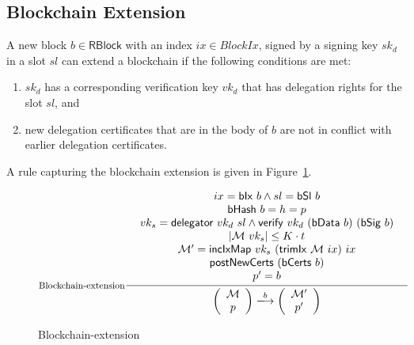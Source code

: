 \documentclass[11pt,a4paper]{article}
\newcommand{\fun}[1]{\mathsf{#1}}
\newcommand{\type}[1]{\mathsf{#1}}
\newcommand{\size}[1]{\left| #1 \right|}
\newcommand{\trans}[2]{\xlongrightarrow[\textsc{#1}]{#2}}
\newcommand{\RBlock}{\type{RBlock}}
\newcommand{\hashname}{bHash}
\newcommand{\verifyname}{verify}
\newcommand{\delegatorname}{delegator} %
\newcommand{\signmapname}{\mathcal{M}}
\newcommand{\trimixname}{trimIx}
\newcommand{\incixmapname}{incIxMap}
\newcommand{\postnewcertsname}{postNewCerts}
\newcommand{\bdataname}{bData}
\newcommand{\bcertsname}{bCerts}
\newcommand{\bsigname}{bSig}
\newcommand{\bixname}{bIx}
\newcommand{\bslname}{bSl}
\newcommand{\verify}[3]{\fun{\verifyname} ~ #1 ~ #2 ~ #3}
\newcommand{\hash}[1]{\fun{\hashname}\ #1}
\newcommand{\delegator}[2]{\fun{\delegatorname} ~ #1 ~ #2}
\newcommand{\signmap}[1]{\fun{\signmapname} ~ #1}
\newcommand{\trimix}[2]{\fun{\trimixname} ~ #1 ~ #2}
\newcommand{\incixmap}[3]{\fun{\incixmapname} ~ #1 ~ #2 ~ #3}
\newcommand{\postnewcerts}[1]{\fun{\postnewcertsname} ~ #1}
\newcommand{\bdata}[1]{\fun{\bdataname} ~ #1}
\newcommand{\bcerts}[1]{\fun{\bcertsname} ~ #1}
\newcommand{\bsig}[1]{\fun{\bsigname} ~ #1}
\newcommand{\bix}[1]{\fun{\bixname} ~ #1}
\newcommand{\bsl}[1]{\fun{\bslname} ~ #1}
\begin{document}
\subsection{Blockchain Extension}
\label{sec:chain-extension}

A new block $b \in \RBlock$ with an index $ix \in BlockIx$, signed by a
signing key $sk_d$ in a slot $sl$ can extend a blockchain if the following
conditions are met:
%
\begin{enumerate}
\item $sk_d$ has a corresponding verification key $vk_d$ that has delegation
  rights for the slot $sl$, and
\item new delegation certificates that are in the body of $b$ are not in
  conflict with earlier delegation certificates.
\end{enumerate}

A rule capturing the blockchain extension is given in
Figure~\ref{fig:blockchain-extension}.

\begin{figure}
  \begin{equation*}
  \inference[Blockchain-extension]
  {
    {\begin{array}{c}
      ix = \bix{b} \wedge sl = \bsl{b} \\
      \hash{b} = h = p \\ %
      vk_s = \delegator{vk_d}{sl} \wedge \verify{vk_d}{(\bdata{b})}{(\bsig{b})} \\
      \size{\signmap{vk_s}} \leq K \cdot t \\
      \signmapname' = \incixmap{vk_s}{(\trimix{\signmapname}{ix})}{ix} \\
      \postnewcerts{(\bcerts{b})} \\
      p' = b 
    \end{array}}
  }
  {
    \left(
      {\begin{array}{c}
         \signmapname \\
         p
       \end{array}}
    \right)
    \trans{}{b}
    \left(
      {\begin{array}{c}
         \signmapname' \\
         p'
       \end{array}}
    \right)
 }
  \end{equation*}
  \caption{Blockchain-extension}
  \label{fig:blockchain-extension}
\end{figure}
\end{document}
